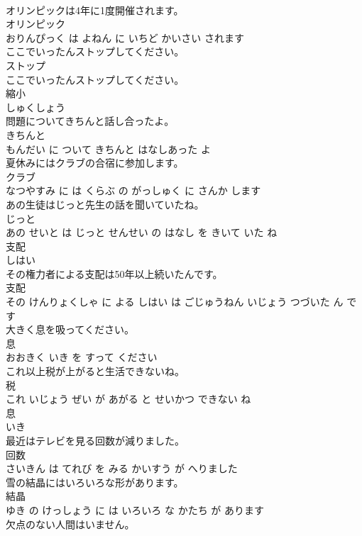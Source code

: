 \documentclass[8pt]{extreport}
\begin{document}
\begin{CJK}{UTF8}{min}
\\	オリンピックは4年に1度開催されます。	
\\	オリンピック 
\\	おりんぴっく は よねん に いちど かいさい されます		
\\	ここでいったんストップしてください。	
\\	ストップ 
\\	ここでいったんストップしてください。		
\\	縮小	
\\	しゅくしょう		
\\	問題についてきちんと話し合ったよ。	
\\	きちんと 
\\	もんだい に ついて きちんと はなしあった よ		
\\	夏休みにはクラブの合宿に参加します。	
\\	クラブ 
\\	なつやすみ に は くらぶ の がっしゅく に さんか します		
\\	あの生徒はじっと先生の話を聞いていたね。	
\\	じっと 
\\	あの せいと は じっと せんせい の はなし を きいて いた ね		
\\	支配	
\\	しはい		
\\	その権力者による支配は50年以上続いたんです。	
\\	支配 
\\	その けんりょくしゃ に よる しはい は ごじゅうねん いじょう つづいた ん です			
\\	大きく息を吸ってください。	
\\	息 
\\	おおきく いき を すって ください			
\\	これ以上税が上がると生活できないね。	
\\	税 
\\	これ いじょう ぜい が あがる と せいかつ できない ね			
\\	息	
\\	いき		
\\	最近はテレビを見る回数が減りました。	
\\	回数 
\\	さいきん は てれび を みる かいすう が へりました			
\\	雪の結晶にはいろいろな形があります。	
\\	結晶 
\\	ゆき の けっしょう に は いろいろ な かたち が あります			
\\	欠点のない人間はいません。	

\end{CJK}
\end{document}

